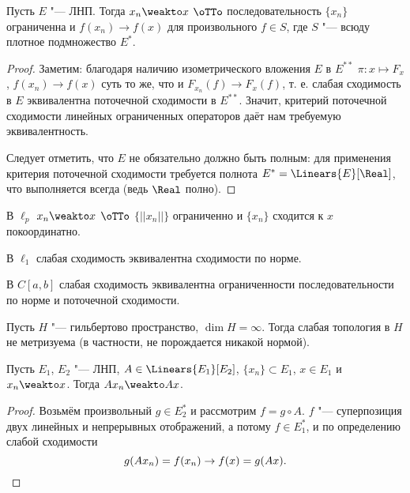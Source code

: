 \documentclass[main]{subfiles}
\begin{document}
\begin{theorem}
  Пусть \( E \) "--- ЛНП.
  Тогда \( x_n \weakto x \) \( \oTTo \)
  последовательность \( \{ x_n \} \) ограниченна
  и \( f(x_n) \to f(x) \) для произвольного \( f \in S \),
  где \( S \) "--- всюду плотное подмножество \( E^* \).
\end{theorem}
\begin{proof}
  Заметим: благодаря наличию изометрического вложения
  \( E \) в \( E^{**} \) \( \pi : x \mapsto F_x \),
  \( f(x_n) \to f(x) \) суть то же, что и
  \( F_{x_n}(f) \to F_x(f) \),
  т. е. слабая сходимость
  в $E$ эквивалентна поточечной сходимости в $E^{**}$.
  Значит, критерий поточечной сходимости линейных
  ограниченных операторов даёт нам требуемую эквивалентность.

  Следует отметить, что \( E \) не обязательно должно быть
  полным: для применения критерия поточечной сходимости
  требуется полнота \( E^* = \Linears{E}[\Real] \),
  что выполняется всегда (ведь \( \Real \) полно).
\end{proof}

\begin{example}
  В  \( \ell_p \) \( x_n \weakto x \) \( \oTTo \)
  \( \{ ||x_n|| \} \) ограниченно и
  \( \{ x_n \} \) сходится к \( x \) покоординатно.
\end{example}

\begin{exercise}
  В \( \ell_1 \) слабая сходимость эквивалентна
  сходимости по норме.
\end{exercise}

\begin{example}
  В \( C[a, b] \) слабая сходимость эквивалентна
  ограниченности последовательности по норме
  и поточечной сходимости.
\end{example}

\begin{theorem*}
  Пусть \( H \) "--- гильбертово пространство,
  \( \dim H = \infty \).
  Тогда слабая топология в \( H \)
  не метризуема (в частности, не порождается никакой нормой).
\end{theorem*}

\begin{theorem}
  Пусть $E_1$, $E_2$ "--- ЛНП,
  $A \in \Linears{E_1}[E_2]$, 
  \( \{ x_n \} \subset E_1 \), \( x \in E_1 \)
  и $x_n \weakto x$.
  Тогда $A x_n \weakto Ax$.
\end{theorem}
\begin{proof}
  Возьмём произвольный $g \in E_2^*$ и рассмотрим $f = g \circ A$.
  $f$ "--- суперпозиция двух линейных и непрерывных отображений,
  а потому $f \in E_1^*$, и по определению слабой сходимости
  \[ g(A x_n) = f(x_n) \to f(x) = g(A x). \qedhere \]
\end{proof}
\end{document}
